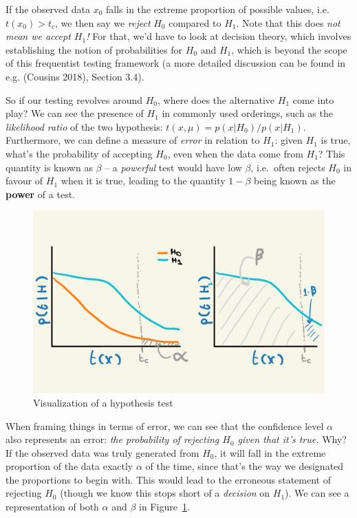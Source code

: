 \documentclass[
  11pt,
  numbers=noendperiod]{book}
\begin{document}
If the observed data \(x_0\) falls in the extreme proportion of possible
values, i.e.~\(t(x_0) > t_c\), we then say we \emph{reject} \(H_0\)
compared to \(H_1\). Note that this does \emph{not mean we accept
\(H_1\)!} For that, we'd have to look at decision theory, which involves
establishing the notion of probabilities for \(H_0\) and \(H_1\), which
is beyond the scope of this frequentist testing framework (a more
detailed discussion can be found in e.g. (Cousins 2018), Section 3.4).

So if our testing revolves around \(H_0\), where does the alternative
\(H_1\) come into play? We can see the presence of \(H_1\) in commonly
used orderings, such as the \emph{likelihood ratio} of the two
hypothesis: \(t(x, \mu) = p(x | H_0)/p(x|H_1)\). Furthermore, we can
define a measure of \emph{error} in relation to \(H_1\): given \(H_1\)
is true, what's the probability of accepting \(H_0\), even when the data
come from \(H_1\)? This quantity is known as \(\beta\) -- a
\emph{powerful} test would have low \(\beta\), i.e.~often rejects
\(H_0\) in favour of \(H_1\) when it is true, leading to the quantity
\(1-\beta\) being known as the \textbf{power} of a test.

\begin{figure}

{\centering \includegraphics{./images/alphabeta.pdf}

}

\caption{\label{fig-visualtest}Visualization of a hypothesis test}

\end{figure}

When framing things in terms of error, we can see that the confidence
level \(\alpha\) also represents an error: \emph{the probability of
rejecting \(H_0\) given that it's true.} Why? If the observed data was
truly generated from \(H_0\), it will fall in the extreme proportion of
the data exactly \(\alpha\) of the time, since that's the way we
designated the proportions to begin with. This would lead to the
erroneous statement of rejecting \(H_0\) (though we know this stops
short of a \emph{decision} on \(H_1\)). We can see a representation of
both \(\alpha\) and \(\beta\) in Figure~\ref{fig-visualtest}.
\end{document}
